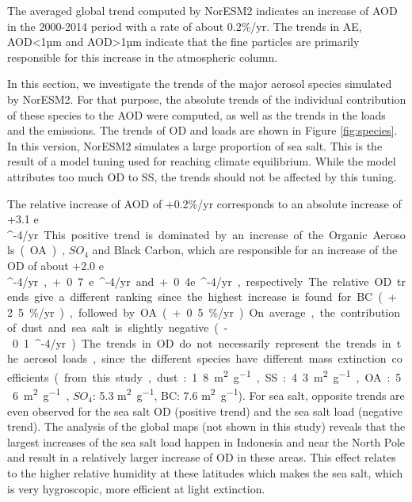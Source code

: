 \documentclass[journal abbreviation, manuscript]{copernicus}
\begin{document}
The averaged global trend computed by NorESM2 indicates an increase of AOD in the 2000-2014 period with a rate of about 0.2\%/yr. The trends in AE, AOD<1µm and AOD>1µm indicate that the fine particles are primarily responsible for this increase in the atmospheric column.

In this section, we investigate the trends of the major aerosol species simulated by NorESM2. For that purpose, the absolute trends of the individual contribution of these species to the AOD were computed, as well as the trends in the loads and the emissions. The trends of OD and loads are shown in Figure \ref{fig:species}. In this version, NorESM2 simulates a large proportion of sea salt. This is the result of a model tuning used for reaching climate equilibrium. While the model attributes too much OD to SS, the trends should not be affected by this tuning.

The relative increase of AOD of +0.2\%/yr corresponds to an absolute increase of +3.1 e \unit{^{-4}/yr}. This positive trend is dominated by an increase of the Organic Aerosols (OA), $SO_{4}$ and Black Carbon, which are responsible for an increase of the OD of about +2.0 e \unit{^{-4}/yr}, +0.7 e \unit{^{-4}/yr} and +0.4e \unit{^{-4}/yr}, respectively. The relative OD trends give a different ranking since the highest increase is found for BC (+2.5\%/yr), followed by OA (+0.5 \%/yr). On average, the contribution of dust and sea salt is slightly negative (-0.1 \unit{^{-4}/yr}).

The trends in OD do not necessarily represent the trends in the aerosol loads, since the different species have different mass extinction coefficients (from this study, dust: 1.8 \unit{m^{2}.g^{-1}}, SS: 4.3 \unit{m^{2}.g^{-1}}, OA: 5.6 \unit{m^{2}.g^{-1}}, $SO_{4}$: 5.3 \unit{m^{2}.g^{-1}}, BC: 7.6 \unit{m^{2}.g^{-1}}). For sea salt, opposite trends are even observed for the sea salt OD (positive trend) and the sea salt load (negative trend). The analysis of the global maps (not shown in this study) reveals that the largest increases of the sea salt load  happen in Indonesia and near the North Pole and result in a relatively larger increase of OD in these areas. This effect relates to the higher relative humidity at these latitudes which makes the sea salt, which is very hygroscopic, more efficient at light extinction.


\conclusions  %
\end{document}
